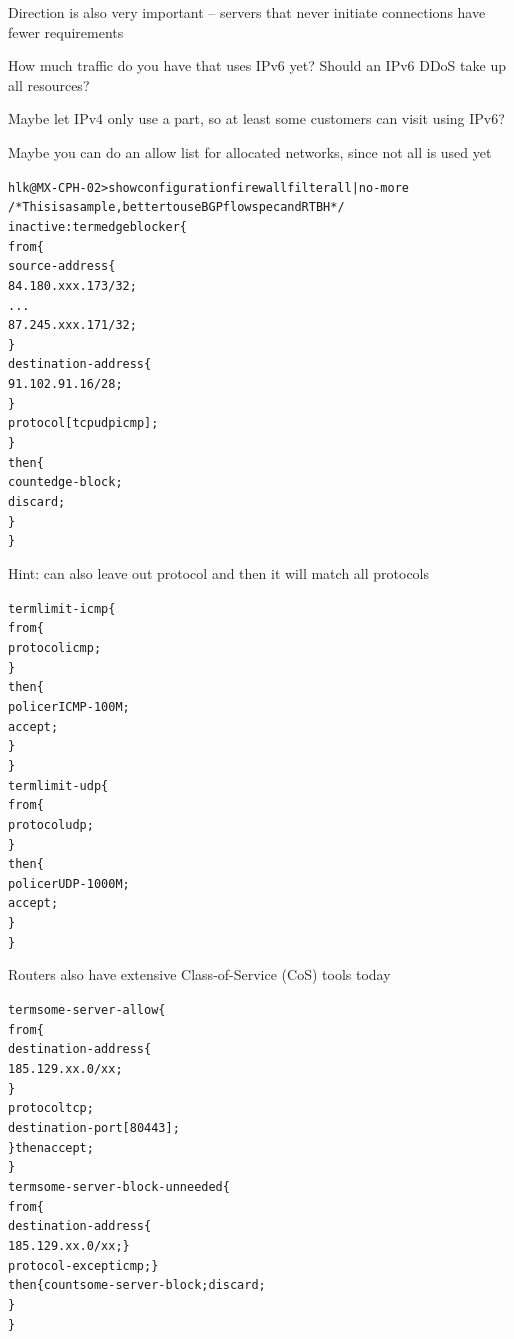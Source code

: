 \documentclass[Screen16to9,17pt]{foils}
\begin{document}
\begin{list2}
\item Direction is also very important -- servers that never initiate connections have fewer requirements
\item How much traffic do you have that uses IPv6 yet? Should an IPv6 DDoS take up all resources?
\item Maybe let IPv4 only use a part, so at least some customers can visit using IPv6?
\item Maybe you can do an allow list for allocated networks, since not all is used yet
\end{list2}



\begin{alltt}\footnotesize
hlk@MX-CPH-02> show configuration firewall filter all | no-more
/* This is a sample, better to use BGP flowspec and RTBH */
inactive: term edgeblocker \{
    from \{
        source-address \{
            84.180.xxx.173/32;
...
            87.245.xxx.171/32;
        \}
        destination-address \{
            91.102.91.16/28;
        \}
        protocol [ tcp udp icmp ];
    \}
    then \{
        count edge-block;
        discard;
    \}
\}
\end{alltt}
Hint: can also leave out protocol and then it will match all protocols


\begin{alltt}\footnotesize
term limit-icmp \{
    from \{
        protocol icmp;
    \}
    then \{
        policer ICMP-100M;
        accept;
    \}
\}
term limit-udp \{
    from \{
        protocol udp;
    \}
    then \{
        policer UDP-1000M;
        accept;
    \}
\}
\end{alltt}

Routers also have extensive Class-of-Service (CoS) tools today


\begin{alltt}\footnotesize
term some-server-allow \{
    from \{
        destination-address \{
            185.129.xx.0/xx;
        \}
        protocol tcp;
        destination-port [ 80 443 ];
    \} then accept;
\}
term some-server-block-unneeded \{
    from \{
        destination-address \{
            185.129.xx.0/xx; \}
        protocol-except icmp;  \}
    then \{ count some-server-block; discard;
    \}
\}
\end{alltt}
\end{document}
